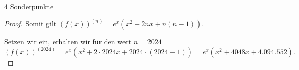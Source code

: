 \documentclass{problemset}
\begin{document}
\begin{problem}{4 Sonderpunkte}
\begin{proof}
	Somit gilt $(f(x))^{(n)} = e^x(x^2 + 2nx + n(n-1))$.

	Setzen wir ein, erhalten wir für den wert $n = 2024$
	\[
		(f(x))^{(2024)} = e^x(x^2 + 2 \cdot 2024x + 2024 \cdot (2024 - 1)) = e^x(x^2 + 4048x + 4.094.552).
	\]


\end{proof}
\end{problem}
\end{document}
